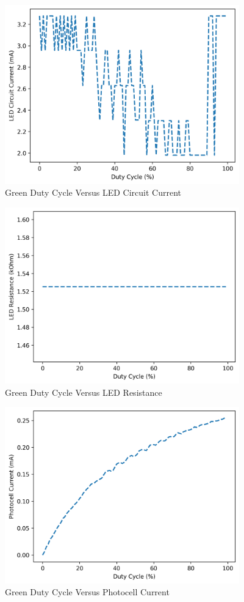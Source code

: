 \documentclass[12pt,titlepage]{article}
\begin{document}
\begin{figure}[!htb]
  \centering
  \includegraphics[width=4in]{lab_4/green_duty_cycle_led_circuit_curr.png}
  \caption{Green Duty Cycle Versus LED Circuit Current}
\end{figure}
\begin{figure}[!htb]
  \centering
  \includegraphics[width=4in]{lab_4/green_duty_cycle_led_res.png}
  \caption{Green Duty Cycle Versus LED Resistance}
\end{figure}
\begin{figure}[!htb]
  \centering
  \includegraphics[width=4in]{lab_4/green_duty_cycle_photo_curr.png}
  \caption{Green Duty Cycle Versus Photocell Current}
\end{figure}
\end{document}
